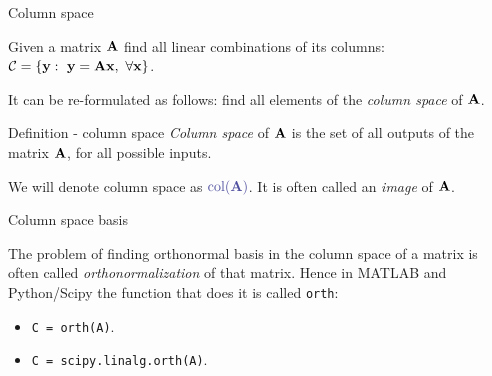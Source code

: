 \documentclass{beamer}
\begin{document}
\begin{frame}{Column space}
	\begin{flushleft}
		
		Given a matrix $\mathbf{A}$ find all linear combinations of its columns: $\mathcal{C} = \{ \mathbf{y}: \ \mathbf{y} = \mathbf{A} \mathbf{x}, \ \forall \mathbf{x}  \}$.
		
		\bigskip
		
		It can be re-formulated as follows: find all elements of the \emph{column space} of $\mathbf{A}$.
		
		\begin{block}{Definition - column space}
			\emph{Column space} of $\mathbf{A}$ is the set of all outputs of the matrix $\mathbf{A}$, for all possible inputs.
		\end{block}
		
		\bigskip
		
		We will denote column space as $\textcolor{mydarkgray}{\text{col}(\bo{A})}$. It is often called an \emph{image} of $\mathbf{A}$.
		
		
	\end{flushleft}
\end{frame}



\begin{frame}{Column space basis}
	\begin{flushleft}
		
		The problem of finding orthonormal basis in the column space of a matrix is often called \emph{orthonormalization} of that matrix. Hence in MATLAB and Python/Scipy the function that does it is called \texttt{orth}:
		
		\bigskip
		
		\begin{itemize}
			\item \texttt{C = orth(A)}.
			\item \texttt{C = scipy.linalg.orth(A)}.
		\end{itemize}
		
		\bigskip
		
%		
		
	\end{flushleft}
\end{frame}
\end{document}
